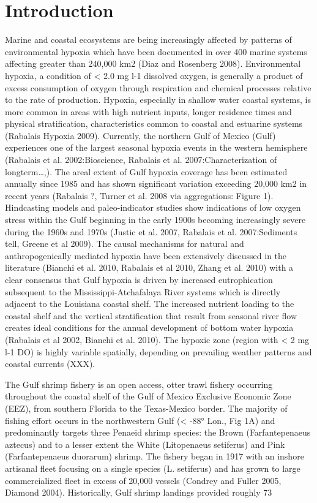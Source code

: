 \documentclass[10pt]{article}
\begin{document}
\section*{Introduction}
Marine and coastal ecosystems are being increasingly affected by patterns of environmental hypoxia which have been documented in over 400 marine systems affecting greater than 240,000 km2 (Diaz and Rosenberg 2008).  Environmental hypoxia, a condition of < 2.0 mg l-1 dissolved oxygen, is generally a product of excess consumption of oxygen through respiration and chemical processes relative to the rate of production.  Hypoxia, especially in shallow water coastal systems, is more common in areas with high nutrient inputs, longer residence times and physical stratification, characteristics common to coastal and estuarine systems (Rabalais Hypoxia 2009).  Currently, the northern Gulf of Mexico (Gulf) experiences one of the largest seasonal hypoxia events in the western hemisphere (Rabalais et al. 2002:Bioscience, Rabalais et al. 2007:Characterization of longterm…,).  The areal extent of Gulf hypoxia coverage has been estimated annually since 1985 and has shown significant variation exceeding 20,000 km2 in recent years (Rabalais ?, Turner et al. 2008 via aggregations: Figure 1).  Hindcasting models and paleo-indicator studies show indications of low oxygen stress within the Gulf beginning in the early 1900s becoming increasingly severe during the 1960s and 1970s (Justic et al. 2007, Rabalais et al. 2007:Sediments tell, Greene et al 2009).  The causal mechanisms for natural and anthropogenically mediated hypoxia have been extensively discussed in the literature (Bianchi et al. 2010, Rabalais et al 2010, Zhang et al. 2010) with a clear consensus that Gulf hypoxia is driven by increased eutrophication subsequent to the Mississippi-Atchafalaya River systems which is directly adjacent to the Louisiana coastal shelf.  The increased nutrient loading to the coastal shelf and the vertical stratification that result from seasonal river flow creates ideal conditions for the annual development of bottom water hypoxia (Rabalais et al 2002, Bianchi et al. 2010).  The hypoxic zone (region with < 2 mg l-1 DO) is highly variable spatially, depending on prevailing weather patterns and coastal currents (XXX).

The Gulf shrimp fishery is an open access, otter trawl fishery occurring throughout the coastal shelf of the Gulf of Mexico Exclusive Economic Zone (EEZ), from southern Florida to the Texas-Mexico border.  The majority of fishing effort occurs in the northwestern Gulf (< -88° Lon., Fig 1A) and predominantly targets three Penaeid shrimp species: the Brown (Farfantepenaeus aztecus) and to a lesser extent the White (Litopenaeus setiferus) and Pink (Farfantepenaeus duorarum) shrimp.  The fishery began in 1917 with an inshore artisanal fleet focusing on a single species (L. setiferus) and has grown to large commercialized fleet in excess of 20,000 vessels (Condrey and Fuller 2005, Diamond 2004).  Historically, Gulf shrimp landings provided roughly 73%
\end{document}

